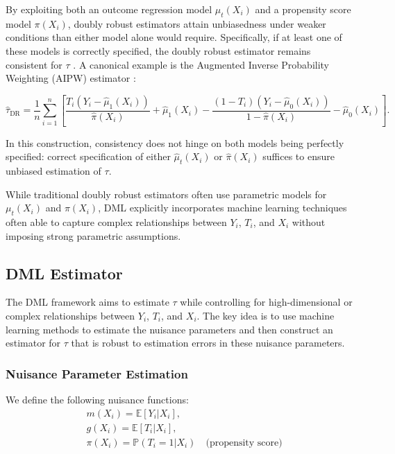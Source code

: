 \documentclass{article}
\numberwithin{equation}{section}
\begin{document}
By exploiting both an outcome regression model \(\mu_t(X_i)\) and a propensity score model \(\pi(X_i)\), doubly robust estimators attain unbiasedness under weaker conditions than either model alone would require. Specifically, if at least one of these models is correctly specified, the doubly robust estimator remains consistent for \(\tau\) \cite{RobinsRotnitzkyZhao1994, BangRobins2005}. A canonical example is the Augmented Inverse Probability Weighting (AIPW) estimator \cite{GlynnQuinn2010}:

\begin{equation}
    \hat{\tau}_{\text{DR}} = \frac{1}{n}\sum_{i=1}^n \left[
    \frac{T_i(Y_i - \hat{\mu}_1(X_i))}{\hat{\pi}(X_i)} + \hat{\mu}_1(X_i)
    - \frac{(1 - T_i)(Y_i - \hat{\mu}_0(X_i))}{1 - \hat{\pi}(X_i)} - \hat{\mu}_0(X_i)
    \right].
\label{eq:dr_estimator}
\end{equation}

In this construction, consistency does not hinge on both models being perfectly specified: correct specification of either \(\hat{\mu}_t(X_i)\) or \(\hat{\pi}(X_i)\) suffices to ensure unbiased estimation of \(\tau\).

While traditional doubly robust estimators often use parametric models for $\mu_t(X_i)$ and $\pi(X_i)$, DML explicitly incorporates machine learning techniques often able to capture complex relationships between $Y_i$, $T_i$, and $X_i$ without imposing strong parametric assumptions.

\subsection{DML Estimator}

The DML framework aims to estimate $\tau$ while controlling for high-dimensional or complex relationships between $Y_i$, $T_i$, and $X_i$. The key idea is to use machine learning methods to estimate the nuisance parameters and then construct an estimator for $\tau$ that is robust to estimation errors in these nuisance parameters.

\subsubsection{Nuisance Parameter Estimation}

We define the following nuisance functions:
\begin{align}
& m(X_i) = \mathbb{E}[Y_i | X_i],
\label{eq:m_x_for_target}
\\
& g(X_i) = \mathbb{E}[T_i | X_i],
\label{eq:g_x_for_treatment}
\\
& \pi(X_i) = \mathbb{P}(T_i = 1 | X_i) \quad \text{(propensity score)}
\label{eq:pi_x_for_treatment}
\end{align}
\end{document}
